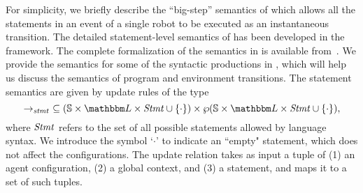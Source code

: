 For simplicity, we briefly describe the ``big-step'' semantics of \lgname which allows all the statements in an event of a single robot to be executed as an instantaneous transition.
The detailed statement-level semantics of \lgname has been developed in the \K framework.
The complete formalization of the semantics in \K is available from~\cite{}.
We provide the semantics for some of the syntactic productions in \lgname,
which will help us discuss the semantics of program and environment transitions.
The statement semantics are given by update rules of the type
\[
\stmtrule\ \subseteq (\pws \times \pwl\times \pwstmt \cup \{\cdot\}) \times \wp(\pws\times \pwl \times \pwstmt \cup \{\cdot\}),
\]
where $\mathit{Stmt}$ refers to the set of all possible statements allowed by language syntax. We introduce the symbol `$\cdot$' to indicate an ``empty" statement, which does not affect the configurations. The update relation takes as input a tuple of (1) an agent configuration, (2) a global context, and (3) a statement, and maps it to a set of such tuples.

